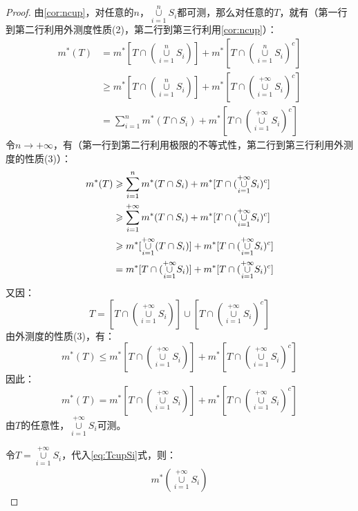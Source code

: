 \begin{proof}
	由\cref{cor:ncup}，对任意的$n$，$\underset{i=1}{\overset{n}{\cup}}S_i$都可测，那么对任意的$T$，就有（第一行到第二行利用外测度性质(2)，第二行到第三行利用\cref{cor:ncup}）：
	\begin{align*}
		m^*(T)&=m^*[T\cap(\underset{i=1}{\overset{n}{\cup}}S_i)]+m^*[T\cap(\underset{i=1}{\overset{n}{\cup}}S_i)^c] \\
		&\geqslant m^*[T\cap(\underset{i=1}{\overset{n}{\cup}}S_i)]+m^*[T\cap(\underset{i=1}{\overset{+\infty}{\cup}}S_i)^c] \\
		&=\sum_{i=1}^nm^*(T\cap S_i)+m^*[T\cap(\underset{i=1}{\overset{+\infty}{\cup}}S_i)^c]
	\end{align*}
	令$n\to+\infty$，有（第一行到第二行利用极限的不等式性，第二行到第三行利用外测度的性质(3)）：
	\begin{align}
		m^*(T)&\geqslant\sum_{i=1}^nm^*(T\cap S_i)+m^*[T\cap(\underset{i=1}{\overset{+\infty}{\cup}}S_i)^c]\notag \\
		&\geqslant\sum_{i=1}^{+\infty} m^*(T\cap S_i)+m^*[T\cap(\underset{i=1}{\overset{+\infty}{\cup}}S_i)^c] \label{eq:TcupSi}\\
		&\geqslant m^*[\underset{i=1}{\overset{+\infty}{\cup}}(T\cap S_i)]+m^*[T\cap(\underset{i=1}{\overset{+\infty}{\cup}}S_i)^c] \notag \\ &=m^*[T\cap(\underset{i=1}{\overset{+\infty}{\cup}}S_i)]+m^*[T\cap(\underset{i=1}{\overset{+\infty}{\cup}}S_i)^c]\notag
	\end{align}
	又因：
	\begin{equation*}
		T=[T\cap(\underset{i=1}{\overset{+\infty}{\cup}}S_i)]\cup[T\cap(\underset{i=1}{\overset{+\infty}{\cup}}S_i)^c]
	\end{equation*}
	由外测度的性质(3)，有：
	\begin{equation*}
		m^*(T)\leqslant m^*[T\cap(\underset{i=1}{\overset{+\infty}{\cup}}S_i)]+m^*[T\cap(\underset{i=1}{\overset{+\infty}{\cup}}S_i)^c]
	\end{equation*}
	因此：
	\begin{equation*}
		m^*(T)= m^*[T\cap(\underset{i=1}{\overset{+\infty}{\cup}}S_i)]+m^*[T\cap(\underset{i=1}{\overset{+\infty}{\cup}}S_i)^c]
	\end{equation*}
	由$T$的任意性，$\underset{i=1}{\overset{+\infty}{\cup}}S_i$可测。\par
	令$T=\underset{i=1}{\overset{+\infty}{\cup}}S_i$，代入\cref{eq:TcupSi}式，则：
	\begin{align*}
		m^*(\underset{i=1}{\overset{+\infty}{\cup}}S_i)

\end{align*}
\end{proof}
